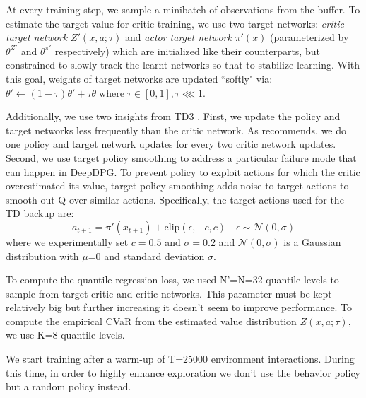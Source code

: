 At every training step, we sample a minibatch of observations from the buffer.
To estimate the target value for critic training, we use two target networks:  \textit{critic target network} $Z'(x,a;\tau)$ and \textit{actor target network}
$\pi'(x)$ (parameterized by $\theta^{Z'}$ and $\theta^{\pi'}$ respectively) which are initialized
like their counterparts, but constrained to slowly track the learnt networks so that to stabilize learning.
With this goal, weights of target networks are updated ``softly" via:
$\theta' \leftarrow (1-\tau)\theta' + \tau\theta \; \text{where} \; \tau \in [0,1], \tau \lll 1$.

Additionally, we use two insights from TD3 \citet{Fujimoto2018}.
First, we update the policy and target networks less frequently than the critic network. As 
\citet{Fujimoto2018} recommends, we do one policy and target network updates for every 
two critic network updates. \\
Second, we use target policy smoothing to address a particular failure mode that can happen
in DeepDPG. To prevent policy to exploit 
actions for which the critic overestimated its value, target policy smoothing adds noise to target actions
to smooth out Q over similar actions. Specifically, the target actions used for the TD backup are:
\begin{equation}
    a_{t+1}=\pi'(x_{t+1}) + \text{clip}(\epsilon, -c, c) \quad \epsilon \sim \mathcal{N}(0,\sigma)
\end{equation}
where we experimentally set $c=0.5$ and $\sigma=0.2$ and $\mathcal{N}(0,\sigma)$ is a
Gaussian distribution with $\mu$=0 and standard deviation $\sigma$.

To compute the quantile regression loss, we used N'=N=32 quantile levels to sample from
target critic and critic networks. This parameter must be kept relatively big but further increasing
it doesn't seem to improve performance.
To compute the empirical CVaR from the estimated value distribution 
$Z(x,a; \tau)$, we use K=8 quantile levels.

We start training after a warm-up of T=25000 environment interactions. During this time, in order
to highly enhance exploration we don't use the behavior policy but a random policy instead.

